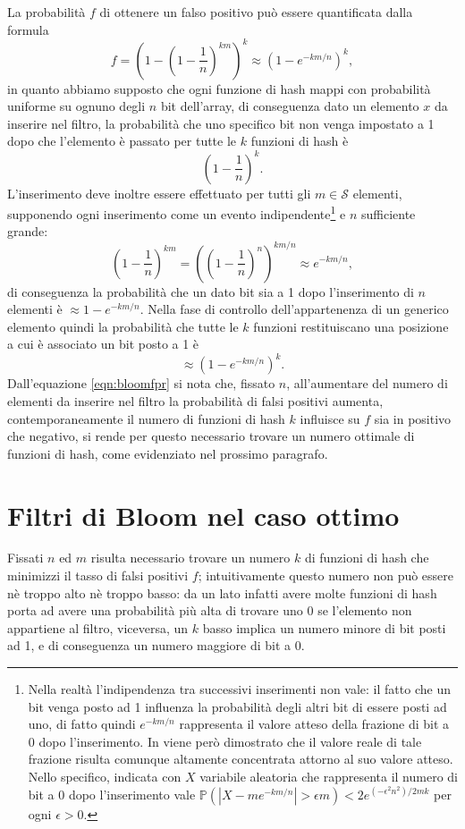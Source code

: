 \documentclass[../../main.tex]{subfiles}
\begin{document}
La probabilità $f$ di ottenere un falso positivo può essere quantificata dalla formula
\begin{equation}
    f = \left(1 - \left(1 - \frac{1}{n}\right)^{km}\right)^k \approx \left(1 - e^{-km/n}\right)^k,
    \label{eqn:bloomfpr}
\end{equation}
in quanto abbiamo supposto che ogni funzione di hash mappi con probabilità uniforme su ognuno degli $n$ bit  dell'array, di conseguenza dato un elemento $x$ da inserire nel filtro, la probabilità che uno specifico bit non venga impostato a 1 dopo che l'elemento è passato per tutte le $k$ funzioni di hash è
\[\left(1 - \frac{1}{n}\right)^k.\]
L'inserimento deve inoltre essere effettuato per tutti gli $m \in \mathcal{S}$ elementi, supponendo ogni inserimento come un evento indipendente\footnote{Nella realtà l'indipendenza tra successivi inserimenti non vale: il fatto che un bit venga posto ad 1 influenza la probabilità degli altri bit di essere posti ad uno, di fatto quindi $e^{-km/n}$ rappresenta il valore atteso della frazione di bit a 0 dopo l'inserimento. In \cite{10.1145/383962.384004} viene però dimostrato che il valore reale di tale frazione risulta comunque altamente concentrata attorno al suo valore atteso. Nello specifico, indicata con $X$ variabile aleatoria che rappresenta il numero di bit a 0 dopo l'inserimento vale $\mathbb{P}\left(|X - m e^{-km/n}| > \epsilon m \right) < 2e^{(-\epsilon^2 n^2)/2mk}$ per ogni $\epsilon > 0$.} e $n$ sufficiente grande:
\[\left(1 - \frac{1}{n}\right)^{km} = \left(\left(1 - \frac{1}{n}\right)^n\right)^{km/n} \approx e^{-km/n},\]
di conseguenza la probabilità che un dato bit sia a 1 dopo l'inserimento di $n$ elementi è $\approx 1 - e^{-km/n}$. Nella fase di controllo dell'appartenenza di un generico elemento quindi la probabilità che tutte le $k$ funzioni restituiscano una posizione a cui è associato un bit posto a 1 è
\[\approx \left(1 - e^{-km/n}\right)^k.\]
Dall'equazione \ref{eqn:bloomfpr} si nota che, fissato $n$, all'aumentare del numero di elementi da inserire nel filtro la probabilità di falsi positivi aumenta, contemporaneamente il numero di funzioni di hash $k$ influisce su $f$ sia in positivo che negativo, si rende per questo necessario trovare un numero ottimale di funzioni di hash, come evidenziato nel prossimo paragrafo.

\section{Filtri di Bloom nel caso ottimo}
Fissati $n$ ed $m$ risulta necessario trovare un numero $k$ di funzioni di hash che minimizzi il tasso di falsi positivi $f$; intuitivamente questo numero non può essere nè troppo alto nè troppo basso: da un lato infatti avere molte funzioni di hash porta ad avere una probabilità più alta di trovare uno 0 se l'elemento non appartiene al filtro, viceversa, un $k$ basso implica un numero minore di bit posti ad 1, e di conseguenza un numero maggiore di bit a 0. 
\end{document}
